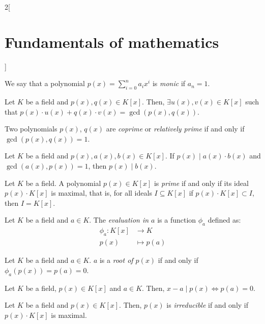 \documentclass[../../../main.tex]{subfiles}
\begin{document}
\begin{multicols}{2}[\section{Fundamentals of mathematics}]
\begin{definition}
    \end{definition}
    \begin{definition}
        We say that a polynomial $p(x)=\sum_{i=0}^na_ix^i$ is \textit{monic} if $a_n=1$.
    \end{definition}
    \begin{theorem}
        Let $K$ be a field and $p(x),q(x)\in K[x]$. Then, $\exists u(x), v(x)\in K[x]$ such that $p(x)\cdot u(x)+q(x)\cdot v(x)=\gcd(p(x),q(x))$.
    \end{theorem}
    \begin{definition}
        Two polynomials $p(x)$, $q(x)$ are \textit{coprime} or \textit{relatively prime} if and only if $\gcd(p(x),q(x))=1$.
    \end{definition}
    \begin{theorem}
        Let $K$ be a field and $p(x),a(x),b(x)\in K[x]$. If $p(x)\mid a(x)\cdot b(x)$ and $\gcd(a(x),p(x))=1$, then $p(x)\mid b(x)$.
    \end{theorem}
    \begin{definition}
        Let $K$ be a field. A polynomial $p(x)\in K[x]$ is \textit{prime} if and only if its ideal $p(x)\cdot K[x]$ is maximal, that is, for all ideals $I\subseteq K[x]$ if $p(x)\cdot K[x] \subset I$, then $I=K[x]$.
    \end{definition}
    \begin{definition}
        Let $K$ be a field and $a\in K$. The \textit{evaluation in $a$} is a function $\phi_a$ defined as:
        \begin{align*}
            \phi_a:K[x] & \longrightarrow K \\
            p(x)        & \longmapsto p(a)
        \end{align*}
    \end{definition}
    \begin{definition}
        Let $K$ be a field and $a\in K$. $a$ is a \textit{root of $p(x)$} if and only if $\phi_a(p(x))=p(a)=0$.
    \end{definition}
    \begin{theorem}
        Let $K$ be a field, $p(x)\in K[x]$ and $a\in K$. Then, $x-a\mid p(x)\iff p(a)=0$.
    \end{theorem}
    \begin{definition}
        Let $K$ be a field and $p(x)\in K[x]$. Then, $p(x)$ is \textit{irreducible} if and only if $p(x)\cdot K[x]$ is maximal.
    \end{definition}

\end{multicols}
\end{document}
